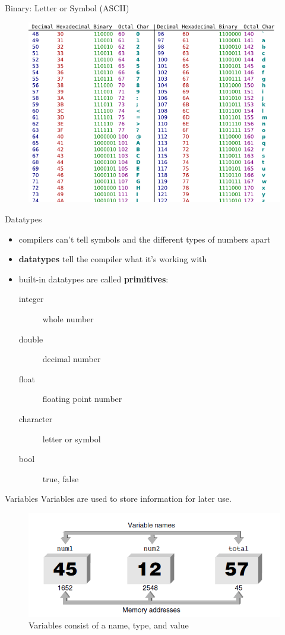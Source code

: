 \documentclass[xcolor={dvipsnames}]{beamer}
\begin{document}
\begin{frame}{Binary: Letter or Symbol (ASCII)}
	\begin{figure}
		\href{https://commons.wikimedia.org/wiki/File:ASCII-Table.svg}{\includegraphics[width=1\textwidth]{ascii}}
	\end{figure}
\end{frame}

\begin{frame}{Datatypes}
	\begin{itemize}
		\item compilers can't tell symbols and the different types of numbers apart
			\pause
		\item \textbf{datatypes} tell the compiler what it's working with
			\pause
		\item built-in datatypes are called \textbf{primitives}:
			\pause
			\begin{description}
				\item [integer] whole number
				\item [double] decimal number
				\item [float] floating point number
				\item [character] letter or symbol
				\item [bool] true, false
			\end{description}
	\end{itemize}
\end{frame}

\begin{frame}{Variables}
	Variables are used to store information for later use. 
	\begin{figure}
		\includegraphics[width=1\textwidth]{variable}
		\caption{Variables consist of a name, type, and value}
	\end{figure}
\end{frame}
\end{document}
